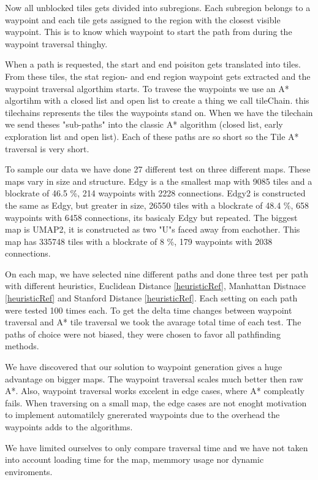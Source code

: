 \documentclass[a4paper]{article}
\begin{document}
Now all unblocked tiles gets divided into subregions. Each subregion belongs to a waypoint and each tile gets assigned to the region with the closest visible waypoint. This is to know which waypoint to start the path from during the waypoint traversal thinghy.

When a path is requested, the start and end poisiton gets translated into tiles. From these tiles, the stat region- and end region waypoint gets extracted and the waypoint traversal algorthim starts. To travese the waypoints we use an A* algortihm with a closed list and open list to create a thing we call tileChain. this tilechains represents the tiles the waypoints stand on.
When we have the tilechain we send theses "sub-paths" into the classic A* algorithm (closed list, early exploration list and open list). Each of these paths are so short so the Tile A* traversal is very short.

To sample our data we have done 27 different test on three different maps. These maps vary in size and structure. Edgy is a the smallest map with 9085 tiles and a blockrate of 46.5 \%, 214 waypoints with 2228 connections. Edgy2 is constructed the same as Edgy, but greater in size, 26550 tiles with a blockrate of 48.4 \%, 658 waypoints with 6458 connections, its basicaly Edgy but repeated. The biggest map is UMAP2, it is constructed as two "U"s faced away from eachother. This map has 335748 tiles with a blockrate of 8 \%, 179 waypoints with 2038 connections.

On each map, we have selected nine different paths and done three test per path with different heuristics, Euclidean Distance \ref{heuristicRef}, Manhattan Distnace \ref{heuristicRef} and Stanford Distance \ref{heuristicRef}.
Each setting on each path were tested 100 times each. To get the delta time changes between waypoint traversal and A* tile traversal we took the avarage total time of each test. The paths of choice were not biased, they were chosen to favor all pathfinding methods.

We have discovered that our solution to waypoint generation gives a huge advantage on bigger maps. The waypoint traversal scales much better then raw A*. Also, waypoint traversal works excelent in edge cases, where A* compleatly fails.
When traversing on a small map, the edge cases are not enoght motivation to implement automatilcly gnererated waypoints due to the overhead the waypoints adds to the algorithms.

We have limited ourselves to only compare traversal time and we have not taken into account loading time for the map, memmory usage nor dynamic enviroments.
	
\end{document}
